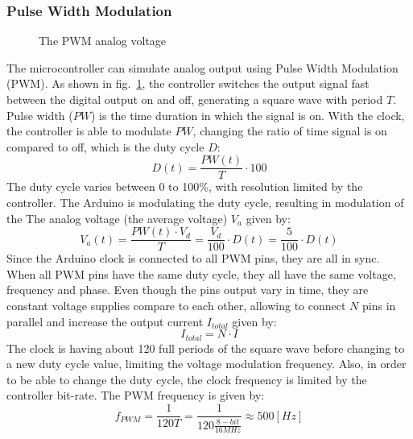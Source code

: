 \documentclass[\main/master.tex]{subfiles}
\begin{document}
\subsubsection{Pulse Width Modulation}
\begin{figure}[htbp]
	\centering
	\caption[The PWM analog voltage]{The PWM analog voltage}
	\label{fig:duty_cycle}
\end{figure}
\FloatBarrier
\par\noindent
The microcontroller can simulate analog output using Pulse Width Modulation (PWM). As shown in fig.~\ref{fig:duty_cycle}, the controller switches the output signal fast between the digital output on and off, generating a square wave with period $T$. Pulse width ($PW$) is the time duration in which the signal is on. With the clock, the controller is able to modulate $PW$, changing the ratio of time signal is on compared to off, which is the duty cycle $D$:
\begin{equation}
D(t) = \frac{PW(t)}{T}\cdot 100  \label{eqn:duty cycle}
\end{equation}
The duty cycle varies between 0 to 100\%, with resolution limited by the controller. The Arduino is modulating the duty cycle, resulting in modulation of the The analog voltage (the average voltage) $V_a$ given by: 
\begin{equation}
V_a(t) = \frac{ PW(t)\cdot V_d}{ T}  = \frac{V_d}{100}\cdot D(t)  = \frac{5}{100}\cdot D(t)  \label{eqn:pwm voltage}
\end{equation}
Since the Arduino clock is connected to all PWM pins, they are all in sync. When all PWM pins have the same duty cycle, they all have the same voltage, frequency and phase. Even though the pins output vary in time, they are constant voltage supplies compare to each other, allowing to connect $N$ pins in parallel and increase the output current $I_{total}$ given by: 
\begin{equation}
I_{total} = N\cdot I   \label{eqn:pwm current}
\end{equation}
The clock is having about 120 full periods of the square wave before changing to a new duty cycle value, limiting the voltage modulation frequency. Also, in order to be able to change the duty cycle, the clock frequency is limited by the controller bit-rate. The PWM frequency is given by:
\begin{equation}
f_{PWM} = \frac{1 }{120T}= \frac{1 }{120 \frac{8-bit }{16MHz}}  \approx 500[Hz]	    \label{eqn:pwm frequency}
\end{equation}
\end{document}

